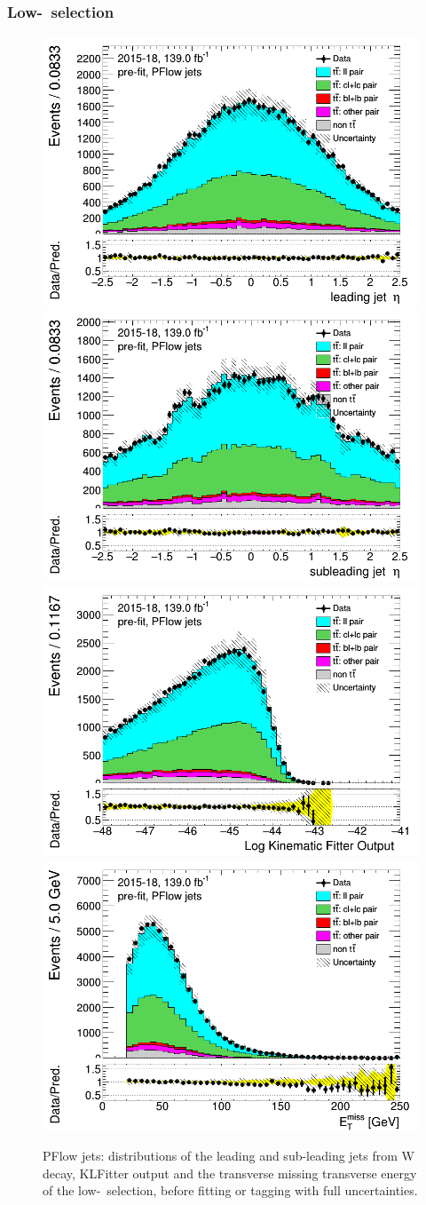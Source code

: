 \documentclass[letterpaper,12pt]{article}
\begin{document}
\subsubsection{Low-\pt\ selection}
\label{sec:appendix_lowpT_selection}
\newpage	
\begin{figure}[H]
\includegraphics[width=.45\textwidth]{FTAG_plots/pretagNoRwLowpTPFlowall/DataMC_h_J0_eta.png}
\includegraphics[width=.45\textwidth]{FTAG_plots/pretagNoRwLowpTPFlowall/DataMC_h_J1_eta.png}\\
\includegraphics[width=.45\textwidth]{FTAG_plots/pretagNoRwLowpTPFlowall/DataMC_h_LLR.png}
\includegraphics[width=.45\textwidth]{FTAG_plots/pretagNoRwLowpTPFlowall/DataMC_h_MET.png}\\

\caption{PFlow jets: distributions of the leading and sub-leading jets 
from W decay, KLFitter output and the transverse missing transverse 
energy of the low-\pt\ selection, before fitting or tagging with 
full uncertainties.} \label{fig:lowpT_jets_VRJets}
\end{figure}
\end{document}
